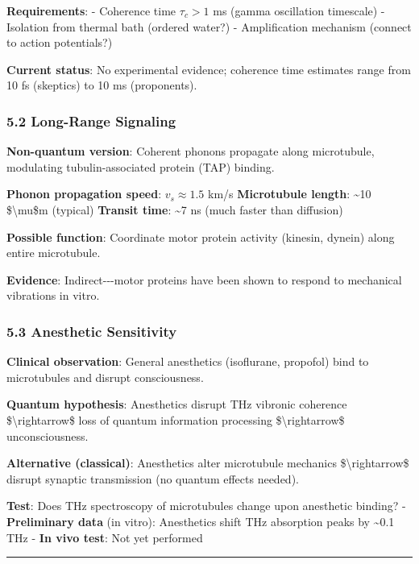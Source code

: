 \textbf{Requirements}: - Coherence time \(\tau_c > 1\) ms (gamma
oscillation timescale) - Isolation from thermal bath (ordered water?) -
Amplification mechanism (connect to action potentials?)

\textbf{Current status}: No experimental evidence; coherence time
estimates range from 10 fs (skeptics) to 10 ms (proponents).

\subsubsection{5.2 Long-Range Signaling}\label{long-range-signaling}

\textbf{Non-quantum version}: Coherent phonons propagate along
microtubule, modulating tubulin-associated protein (TAP) binding.

\textbf{Phonon propagation speed}: \(v_s \approx 1.5\) km/s
\textbf{Microtubule length}: \textasciitilde10 \$\textbackslash mu\$m
(typical) \textbf{Transit time}: \textasciitilde7 ns (much faster than
diffusion)

\textbf{Possible function}: Coordinate motor protein activity (kinesin,
dynein) along entire microtubule.

\textbf{Evidence}: Indirect-\/-\/-motor proteins have been shown to
respond to mechanical vibrations in vitro.

\subsubsection{5.3 Anesthetic Sensitivity}\label{anesthetic-sensitivity}

\textbf{Clinical observation}: General anesthetics (isoflurane,
propofol) bind to microtubules and disrupt consciousness.

\textbf{Quantum hypothesis}: Anesthetics disrupt THz vibronic coherence
\$\textbackslash rightarrow\$ loss of quantum information processing
\$\textbackslash rightarrow\$ unconsciousness.

\textbf{Alternative (classical)}: Anesthetics alter microtubule
mechanics \$\textbackslash rightarrow\$ disrupt synaptic transmission
(no quantum effects needed).

\textbf{Test}: Does THz spectroscopy of microtubules change upon
anesthetic binding? - \textbf{Preliminary data} (in vitro): Anesthetics
shift THz absorption peaks by \textasciitilde0.1 THz - \textbf{In vivo
test}: Not yet performed

\begin{center}\rule{0.5\linewidth}{0.5pt}\end{center}

